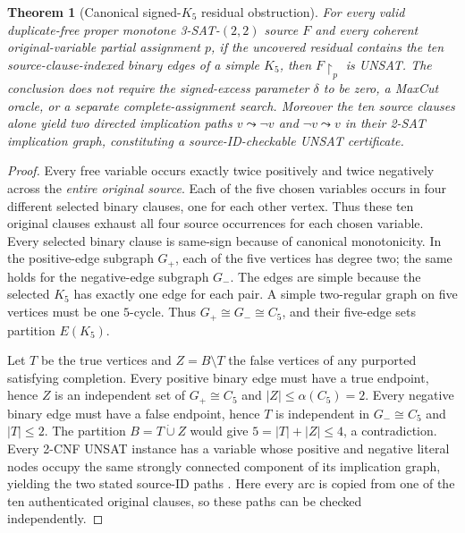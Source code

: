 \documentclass[11pt]{article}
\newtheorem{theorem}{Theorem}
\begin{document}
\begin{theorem}[Canonical signed-$K_5$ residual obstruction]\label{thm:k5}
For \emph{every} valid duplicate-free proper monotone 3-SAT-$(2,2)$ source $F$ and \emph{every} coherent original-variable partial assignment $p$, if the uncovered residual contains the ten source-clause-indexed binary edges of a simple $K_5$, then $F\upharpoonright_p$ is UNSAT. The conclusion does not require the signed-excess parameter $\delta$ to be zero, a MaxCut oracle, or a separate complete-assignment search. Moreover the ten source clauses alone yield two directed implication paths $v\leadsto\neg v$ and $\neg v\leadsto v$ in their 2-SAT implication graph, constituting a source-ID-checkable UNSAT certificate.
\end{theorem}
\begin{proof}
Every free variable occurs exactly twice positively and twice negatively across the \emph{entire original source}. Each of the five chosen variables occurs in four different selected binary clauses, one for each other vertex. Thus these ten original clauses exhaust all four source occurrences for each chosen variable. Every selected binary clause is same-sign because of canonical monotonicity. In the positive-edge subgraph $G_+$, each of the five vertices has degree two; the same holds for the negative-edge subgraph $G_-$. The edges are simple because the selected $K_5$ has exactly one edge for each pair. A simple two-regular graph on five vertices must be one $5$-cycle. Thus $G_+\cong G_-\cong C_5$, and their five-edge sets partition $E(K_5)$.

Let $T$ be the true vertices and $Z=B\setminus T$ the false vertices of any purported satisfying completion. Every positive binary edge must have a true endpoint, hence $Z$ is an independent set of $G_+\cong C_5$ and $|Z|\le\alpha(C_5)=2$. Every negative binary edge must have a false endpoint, hence $T$ is independent in $G_-\cong C_5$ and $|T|\le2$. The partition $B=T\mathbin{\dot\cup} Z$ would give $5=|T|+|Z|\le4$, a contradiction. Every 2-CNF UNSAT instance has a variable whose positive and negative literal nodes occupy the same strongly connected component of its implication graph, yielding the two stated source-ID paths \cite{aspvall1979}. Here every arc is copied from one of the ten authenticated original clauses, so these paths can be checked independently.\end{proof}
\end{document}
